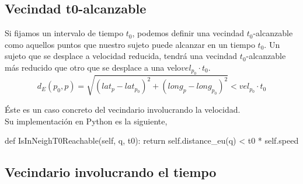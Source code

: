 \documentclass[a4paper, 12pt]{article}
\begin{document}
%
%
%
%
%
%

\subsection{Vecindad t0-alcanzable}

Si fijamos un intervalo de tiempo $t_0$, podemos definir una vecindad $t_0$-alcanzable como aquellos puntos que nuestro sujeto puede alcanzar en un tiempo $t_0$. Un sujeto que se desplace a velocidad reducida, tendr\'a una vecindad $t_0$-alcanzable m\'as reducido  que otro que se desplace a una velo$vel_{p_0}\cdot t_0$.  \\

$$ d_E(p_0, p) = \sqrt{(lat_{p} - lat_{p_0})^2 + (long_{p} - long_{p_0})^2 } < vel_{p_0} \cdot t_0 $$

\'Este es un caso concreto del vecindario involucrando la velocidad. \\


Su implementaci\'on en Python es la siguiente,\\

\begin{python}
        def IsInNeighT0Reachable(self, q, t0):
                return self.distance_eu(q) < t0 * self.speed
\end{python}

\subsection{Vecindario involucrando el tiempo}
\end{document}
